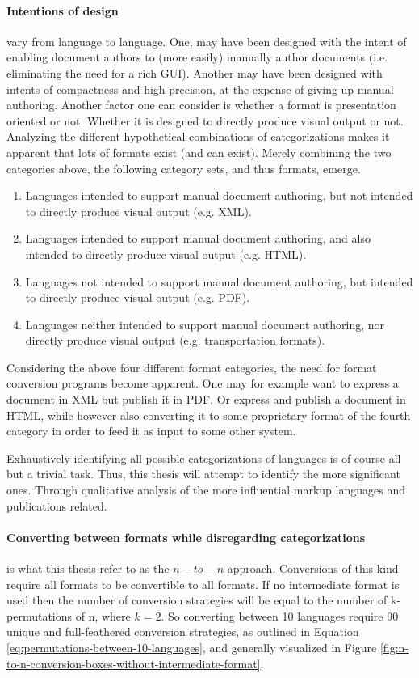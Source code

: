 \documentclass{scrreprt}
\begin{document}
\paragraph{Intentions of design} vary from language to language. One, may have been designed with the intent of enabling document authors to (more easily) manually author documents (i.e. eliminating the need for a rich GUI). Another may have been designed with intents of compactness and high precision, at the expense of giving up manual authoring. Another factor one can consider is whether a format is presentation oriented or not. Whether it is designed to directly produce visual output or not. Analyzing the different hypothetical combinations of categorizations makes it apparent that lots of formats exist (and can exist). Merely combining the two categories above, the following category sets, and thus formats, emerge.

\begin{enumerate}
\item Languages intended to support manual document authoring, but not intended to directly produce visual output (e.g. XML).
\item Languages intended to support manual document authoring, and also intended to directly produce visual output (e.g. HTML).
\item Languages not intended to support manual document authoring, but intended to directly produce visual output (e.g. PDF).
\item Languages neither intended to support manual document authoring, nor directly produce visual output (e.g. transportation formats).
\end{enumerate}

Considering the above four different format categories, the need for format conversion programs become apparent. One may for example want to express a document in XML but publish it in PDF. Or express and publish a document in HTML, while however also converting it to some proprietary format of the fourth category in order to feed it as input to some other system.

Exhaustively identifying all possible categorizations of languages is of course all but a trivial task. Thus, this thesis will attempt to identify the more significant ones. Through qualitative analysis of the more influential markup languages and publications related. 

\paragraph{Converting between formats while disregarding categorizations} is what this thesis refer to as the $n-to-n$ approach. Conversions of this kind require all formats to be convertible to all formats. If no intermediate format is used then the number of conversion strategies will be equal to the number of k-permutations of n, where $k=2$. So converting between 10 languages require 90 unique and full-feathered conversion strategies, as outlined in Equation \ref{eq:permutations-between-10-languages}, and generally visualized in Figure \ref{fig:n-to-n-conversion-boxes-without-intermediate-format}.
\end{document}
